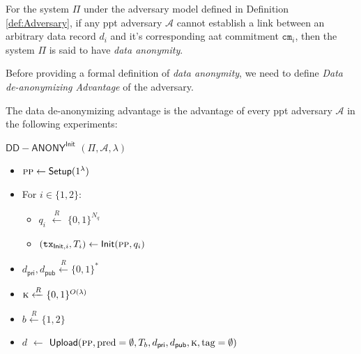 \begin{definition}
    \label{def:informal-Data Anonymity}
    For the system $\Pi$ under the adversary model defined in Definition \ref{def:Adversary}, if any \gls{ppt} adversary $\mathcal{A}$ cannot establish a link between an arbitrary data record $d_i$ and it's corresponding \gls{aat} commitment $\texttt{cm}_i$, then the system $\Pi$ is said to have \textit{data anonymity}. 
\end{definition}

Before providing a formal definition of \textit{data anonymity}, we need to define \textit{Data de-anonymizing Advantage} of the adversary.

\begin{definition}
            \label{def:Data Deanonymizing Advantage} 
            The data de-anonymizing advantage is the advantage of every \gls{ppt} adversary $\mathcal{A}$ in the following experiments:

            $\mathsf{DD-ANONY}^\textsf{Init}$  $(\Pi, \mathcal{A}, \lambda)$%
        \begin{itemize}
                \item [] $\textsc{pp} \leftarrow \textsf{Setup}(1^\lambda)$ 

                
                \item []  For $ i \in \{1, 2\}$:
                \begin{itemize}
                    \item [] $q_i$ $\xleftarrow{R}$ $\{0, 1\}^{N_q}$ 
                    \item [] $(\texttt{tx}_{\mathsf{Init}, i}, T_i) \leftarrow \textsf{Init}(\textsc{pp}, q_i)$
                \end{itemize}
                
                
                \item[] $d_\mathsf{pri}, d_\mathsf{pub} \xleftarrow{R} \{0,1\}^\ast$
                \item[] $\textsc{k} \xleftarrow{R} \{0,1\}^{O(\lambda)}$
                \item[] $b \xleftarrow{R} \{1, 2\}$
                \item[] $d$ $\leftarrow$ $\mathsf{Upload}(\textsc{pp}, \text{pred} = \emptyset , T_b, d_\mathsf{pri}, d_\mathsf{pub}, \textsc{k}, \text{tag} = \emptyset)$


\end{itemize}
\end{definition}
